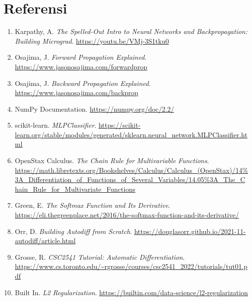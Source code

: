 \section*{Referensi}

\begin{enumerate}
    \item Karpathy, A. \textit{The Spelled-Out Intro to Neural Networks and
          Backpropagation: Building Micrograd}. \url{https://youtu.be/VMj-3S1tku0}

    \item Osajima, J. \textit{Forward Propagation Explained}.
          \url{https://www.jasonosajima.com/forwardprop}

    \item Osajima, J. \textit{Backward Propagation Explained}.
          \url{https://www.jasonosajima.com/backprop}

    \item NumPy Documentation. \url{https://numpy.org/doc/2.2/}

    \item scikit-learn. \textit{MLPClassifier}.
          \url{https://scikit-learn.org/stable/modules/generated/sklearn.neural_network.MLPClassifier.html}

    \item OpenStax Calculus. \textit{The Chain Rule for Multivariable Functions}.
          \url{https://math.libretexts.org/Bookshelves/Calculus/Calculus_(OpenStax)/14\%3A_Differentiation_of_Functions_of_Several_Variables/14.05\%3A_The_Chain_Rule_for_Multivariate_Functions}

    \item Green, E. \textit{The Softmax Function and Its Derivative}.
          \url{https://eli.thegreenplace.net/2016/the-softmax-function-and-its-derivative/}

    \item Orr, D. \textit{Building Autodiff from Scratch}.
          \url{https://douglasorr.github.io/2021-11-autodiff/article.html}

    \item Grosse, R. \textit{CSC2541 Tutorial: Automatic Differentiation}.
          \url{https://www.cs.toronto.edu/~rgrosse/courses/csc2541_2022/tutorials/tut01.pdf}

    \item Built In. \textit{L2 Regularization}.
          \url{https://builtin.com/data-science/l2-regularization}
\end{enumerate}
